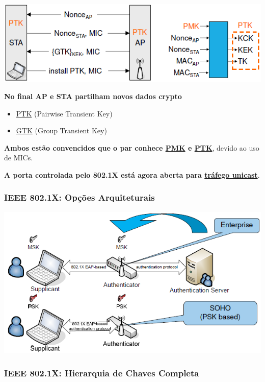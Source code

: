 \documentclass{article}
\begin{document}
\begin{center}
  \includegraphics[scale=0.6]{53}
\end{center}

\textbf{No final AP e STA partilham novos dados crypto}
\begin{itemize}
  \item \uline{PTK} (Pairwise Transient Key)
  \item \uline{GTK} (Group Transient Key)
\end{itemize}

\textbf{Ambos estão convencidos que o par conhece \uline{PMK} e \uline{PTK}},
devido ao uso de MICs.

\vspace{2mm}

\textbf{A porta controlada pelo 802.1X está agora aberta para \uline{tráfego unicast}}.

\subsubsection{IEEE 802.1X: Opções Arquiteturais}

\begin{center}
  \includegraphics[scale=0.6]{54}
\end{center}

\pagebreak

\subsubsection{IEEE 802.1X: Hierarquia de Chaves Completa}
\end{document}
